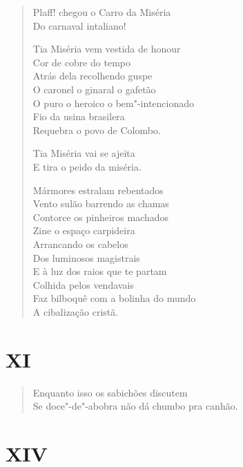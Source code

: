 \begin{verse}
Plaff! chegou o Carro da Miséria\\
Do carnaval intaliano!

Tia Miséria vem vestida de honour\\
Cor de cobre do tempo\\
Atrás dela recolhendo guspe\\
O caronel o ginaral o gafetão\\
O puro o heroico o bem"-intencionado\\
Fio da usina brasilera\\
Requebra o povo de Colombo.

Tia Miséria vai se ajeita\\
E tira o peido da miséria.

Mármores estralam rebentados\\
Vento sulão barrendo as chamas\\
Contorce os pinheiros machados\\
Zine o espaço carpideira\\
Arrancando os cabelos\\
Dos luminosos magistrais\\
E à luz dos raios que te partam\\
Colhida pelos vendavais\\
Faz bilboquê com a bolinha do mundo\\
A cibalização cristã.
\end{verse}

\pagebreak
\section*{XI}

\begin{verse}
Enquanto isso os sabichões discutem\\
Se doce"-de"-abobra não dá chumbo pra canhão.
\end{verse}

\pagebreak
\section*{XIV}

